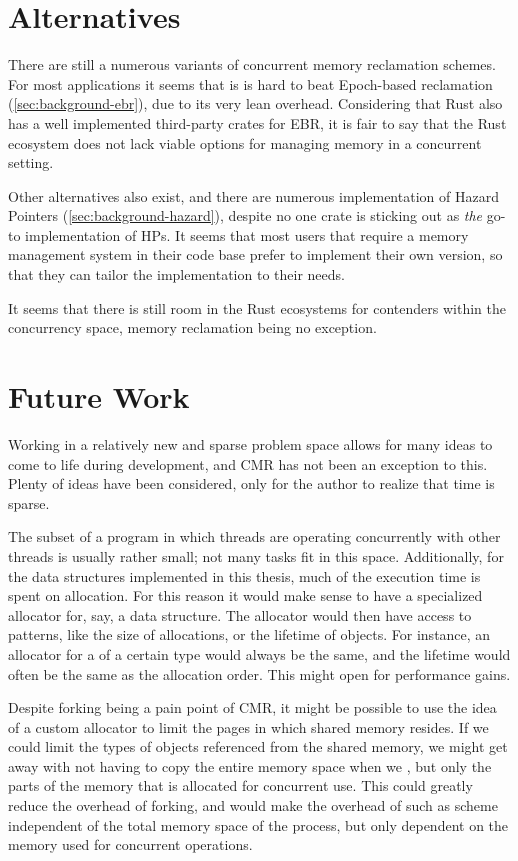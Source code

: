 \section{Alternatives}

There are still a numerous variants of concurrent memory reclamation schemes. For most applications
it seems that is is hard to beat Epoch-based reclamation (\cref{sec:background-ebr}), due to its
very lean overhead. Considering that Rust also has a well implemented third-party crates for EBR,
it is fair to say that the Rust ecosystem does not lack viable options for managing memory in a
concurrent setting.

Other alternatives also exist, and there are numerous implementation of Hazard Pointers
(\cref{sec:background-hazard}), despite no one crate is sticking out as \emph{the} go-to
implementation of HPs. It seems that most users that require a memory management system in their
code base prefer to implement their own version, so that they can tailor the implementation to
their needs.

It seems that there is still room in the Rust ecosystems for contenders within the concurrency
space, memory reclamation being no exception.


\section{Future Work}

Working in a relatively new and sparse problem space allows for many ideas to come to life during
development, and CMR has not been an exception to this. Plenty of ideas have been considered, only
for the author to realize that time is sparse.

The subset of a program in which threads are operating concurrently with other threads is usually
rather small; not many tasks fit in this space. Additionally, for the data structures implemented
in this thesis, much of the execution time is spent on allocation. For this reason it would make
sense to have a specialized allocator for, say, a data structure. The allocator would then have
access to patterns, like the size of allocations, or the lifetime of objects. For instance, an
allocator for a  of a certain type would always be the same, and the lifetime would
often be the same as the allocation order. This might open for performance gains.

Despite forking being a pain point of CMR, it might be possible to use the idea of a custom
allocator to limit the pages in which shared memory resides. If we could limit the types of objects
referenced from the shared memory, we might get away with not having to copy the entire memory
space when we , but only the parts of the memory that is allocated for concurrent use.
This could greatly reduce the overhead of forking, and would make the overhead of such as scheme
independent of the total memory space of the process, but only dependent on the memory used for
concurrent operations.

